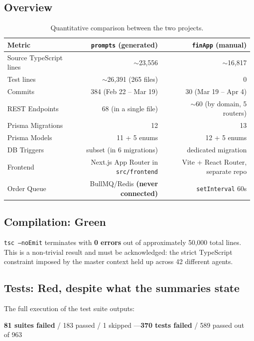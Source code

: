 \documentclass[11pt,a4paper]{article}
\newcommand{\ok}[1]{\textcolor{okgreen}{\textbf{#1}}}
\newcommand{\fail}[1]{\textcolor{failred}{\textbf{#1}}}
\newcommand{\file}[1]{\texttt{\small #1}}
\begin{document}
	\subsection{Overview}
	
	\begin{table}[h!]
		\centering
		\small
		\begin{tabular}{lrr}
			\toprule
			\textbf{Metric} & \textbf{\file{prompts} (generated)} & \textbf{\file{finApp} (manual)} \\
			\midrule
			Source TypeScript lines & $\sim$23,556 & $\sim$16,817 \\
			Test lines & $\sim$26,391 (265 files) & 0 \\
			Commits & 384 (Feb 22 -- Mar 19) & 30 (Mar 19 -- Apr 4) \\
			REST Endpoints & 68 (in a single file) & $\sim$60 (by domain, 5 routers) \\
			Prisma Migrations & 12 & 13 \\
			Prisma Models & 11 + 5 enums & 12 + 5 enums \\
			DB Triggers & subset (in 6 migrations) & dedicated migration \\
			Frontend & Next.js App Router in \file{src/frontend} & Vite + React Router, separate repo \\
			Order Queue & BullMQ/Redis \fail{(never connected)} & \file{setInterval} 60s \\
			\bottomrule
		\end{tabular}
		\caption{Quantitative comparison between the two projects.}
	\end{table}
	
	\subsection{Compilation: Green}
	\file{tsc --noEmit} terminates with \ok{0 errors} out of approximately 50,000 total lines. This is a non-trivial result and must be acknowledged: the strict TypeScript constraint imposed by the master context held up across 42 different agents.
	
	\subsection{Tests: Red, despite what the summaries state}
	The full execution of the test suite outputs:
	
	\begin{center}
		\fail{81 suites failed} / 183 passed / 1 skipped \quad---\quad \fail{370 tests failed} / 589 passed out of 963
	\end{center}
	
\end{document}
